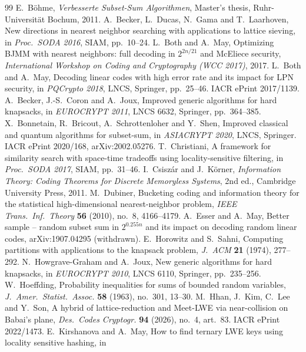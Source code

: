 \documentclass[11pt]{article}
\theoremstyle{definition}
\theoremstyle{remark}
\begin{document}
\begin{thebibliography}{99}
 E.~B\"ohme, \emph{Verbesserte Subset-Sum Algorithmen}, Master's thesis, Ruhr-Universit\"at Bochum,
2011.
 A.~Becker, L.~Ducas, N.~Gama and T.~Laarhoven, New directions in nearest neighbor searching with
applications to lattice sieving, in \emph{Proc.\ SODA 2016}, SIAM, pp.~10--24.
 L.~Both and A.~May, Optimizing BJMM with nearest neighbors: full decoding in $2^{2n/21}$ and McEliece
security, \emph{International Workshop on Coding and Cryptography (WCC 2017)}, 2017.
 L.~Both and A.~May, Decoding linear codes with high error rate and its impact for LPN security, in
\emph{PQCrypto 2018}, LNCS, Springer, pp.~25--46. IACR ePrint 2017/1139.
 A.~Becker, J.-S.~Coron and A.~Joux, Improved generic algorithms for hard knapsacks, in
\emph{EUROCRYPT 2011}, LNCS 6632, Springer, pp.~364--385.
 X.~Bonnetain, R.~Bricout, A.~Schrottenloher and Y.~Shen, Improved classical and quantum algorithms
for subset-sum, in \emph{ASIACRYPT 2020}, LNCS, Springer. IACR ePrint 2020/168, arXiv:2002.05276.
 T.~Christiani, A framework for similarity search with space-time tradeoffs using locality-sensitive
filtering, in \emph{Proc.\ SODA 2017}, SIAM, pp.~31--46.
 I.~Csisz\'ar and J.~K\"orner, \emph{Information Theory: Coding Theorems for Discrete Memoryless
Systems}, 2nd ed., Cambridge University Press, 2011.
 M.~Dubiner, Bucketing coding and information theory for the statistical high-dimensional
nearest-neighbor problem, \emph{IEEE Trans.\ Inf.\ Theory} \textbf{56} (2010), no.~8, 4166--4179.
 A.~Esser and A.~May, Better sample -- random subset sum in $2^{0.255n}$ and its impact on decoding
random linear codes, arXiv:1907.04295 (withdrawn).
 E.~Horowitz and S.~Sahni, Computing partitions with applications to the knapsack problem,
\emph{J.\ ACM} \textbf{21} (1974), 277--292.
 N.~Howgrave-Graham and A.~Joux, New generic algorithms for hard knapsacks, in \emph{EUROCRYPT 2010},
LNCS 6110, Springer, pp.~235--256.
 W.~Hoeffding, Probability inequalities for sums of bounded random variables, \emph{J.\ Amer.\
Statist.\ Assoc.} \textbf{58} (1963), no.~301, 13--30.
 M.~Hhan, J.~Kim, C.~Lee and Y.~Son, A hybrid of lattice-reduction and Meet-LWE via near-collision on
Babai's plane, \emph{Des.\ Codes Cryptogr.} \textbf{94} (2026), no.~4, art.~83. IACR ePrint 2022/1473.
\bibitem{KM21} E.~Kirshanova and A.~May, How to find ternary LWE keys using locality sensitive hashing, in

\end{thebibliography}
\end{document}
